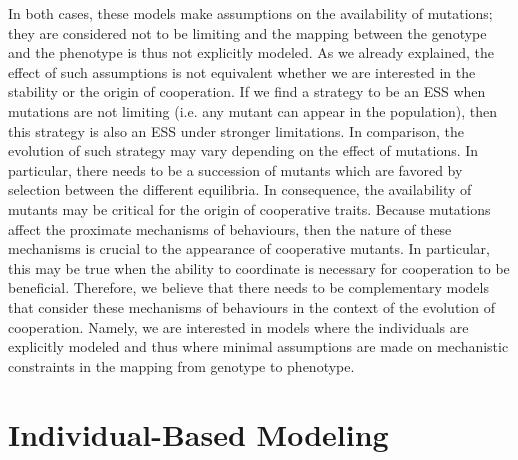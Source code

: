             In both cases, these models make assumptions on the availability of mutations; they are considered not to be limiting and the mapping between the genotype and the phenotype is thus not explicitly modeled. As we already explained, the effect of such assumptions is not equivalent whether we are interested in the stability or the origin of cooperation. If we find a strategy to be an ESS when mutations are not limiting (i.e. any mutant can appear in the population), then this strategy is also an ESS under stronger limitations. In comparison, the evolution of such strategy may vary depending on the effect of mutations. In particular, there needs to be a succession of mutants which are favored by selection between the different equilibria. In consequence, the availability of mutants may be critical for the origin of cooperative traits. Because mutations affect the proximate mechanisms of behaviours, then the nature of these mechanisms is crucial to the appearance of cooperative mutants. In particular, this may be true when the ability to coordinate is necessary for cooperation to be beneficial. Therefore, we believe that there needs to be complementary models that consider these mechanisms of behaviours in the context of the evolution of cooperation. Namely, we are interested in models where the individuals are explicitly modeled and thus where minimal assumptions are made on mechanistic constraints in the mapping from genotype to phenotype.



\section{Individual-Based Modeling}


